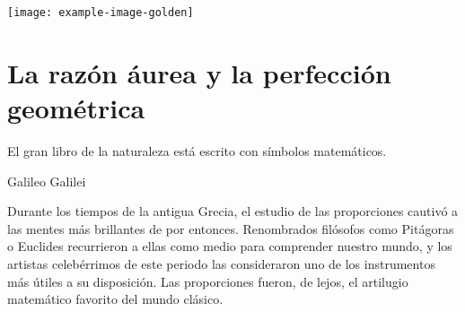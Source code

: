 \documentclass[
    title={Lorem Ipsum},
    author={Henry Díaz Bordón},
    publisher={Summer of Math Exposition IV}
]{hessay}
\begin{document}
    \begin{titlepage}
        \begin{center}
            \vspace*{1cm}
            \Huge
            \textbf{\doctitle}
                
            \vspace{1.5cm}

            \LARGE
            \textsc{\docauthor}
                
            \vfill

            \texttt{[image: example-image-golden]}

            \vfill
                
            \docpublisher
                
            \vspace{0.8cm}
        \end{center}
    \end{titlepage}

    \chapter{La razón áurea y la perfección geométrica}
    \epigraph{El gran libro de la naturaleza está escrito con símbolos matemáticos.}{Galileo Galilei}
    Durante los tiempos de la antigua Grecia, el estudio de las proporciones cautivó a las mentes más brillantes de por entonces. Renombrados filósofos como Pitágoras o Euclides recurrieron a ellas como medio para comprender nuestro mundo, y los artistas celebérrimos de este periodo las consideraron uno de los instrumentos más útiles a su disposición. Las proporciones fueron, de lejos, el artilugio matemático favorito del mundo clásico.

    \lipsum[1-10]

    \nocite{*}
    \printbibliography
\end{document}

